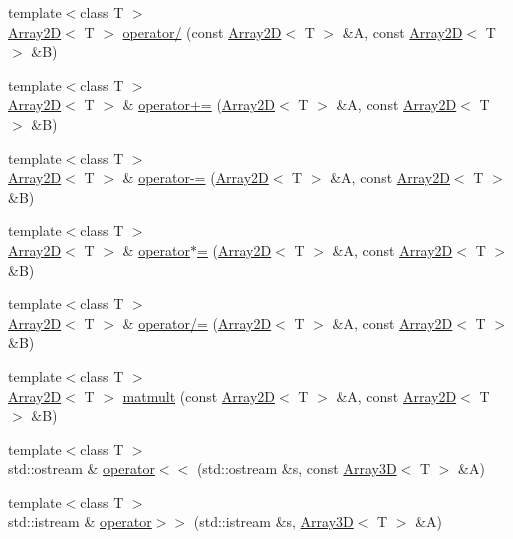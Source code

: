 \begin{DoxyCompactItemize}
\item 
{\footnotesize template$<$class T $>$ }\\\hyperlink{classTNT_1_1Array2D}{Array2D}$<$ T $>$ \hyperlink{namespaceTNT_af2275486defb3aa682168d59c8b5fefa}{operator/} (const \hyperlink{classTNT_1_1Array2D}{Array2D}$<$ T $>$ \&A, const \hyperlink{classTNT_1_1Array2D}{Array2D}$<$ T $>$ \&B)
\item 
{\footnotesize template$<$class T $>$ }\\\hyperlink{classTNT_1_1Array2D}{Array2D}$<$ T $>$ \& \hyperlink{namespaceTNT_a613b54428f9d71ec88bba64f0b1b2956}{operator+=} (\hyperlink{classTNT_1_1Array2D}{Array2D}$<$ T $>$ \&A, const \hyperlink{classTNT_1_1Array2D}{Array2D}$<$ T $>$ \&B)
\item 
{\footnotesize template$<$class T $>$ }\\\hyperlink{classTNT_1_1Array2D}{Array2D}$<$ T $>$ \& \hyperlink{namespaceTNT_a5f46b48fb7c2c25d9c78c888dfbfbb59}{operator-\/=} (\hyperlink{classTNT_1_1Array2D}{Array2D}$<$ T $>$ \&A, const \hyperlink{classTNT_1_1Array2D}{Array2D}$<$ T $>$ \&B)
\item 
{\footnotesize template$<$class T $>$ }\\\hyperlink{classTNT_1_1Array2D}{Array2D}$<$ T $>$ \& \hyperlink{namespaceTNT_a5d9f342f2de5edc0fce4481982924e44}{operator$\ast$=} (\hyperlink{classTNT_1_1Array2D}{Array2D}$<$ T $>$ \&A, const \hyperlink{classTNT_1_1Array2D}{Array2D}$<$ T $>$ \&B)
\item 
{\footnotesize template$<$class T $>$ }\\\hyperlink{classTNT_1_1Array2D}{Array2D}$<$ T $>$ \& \hyperlink{namespaceTNT_a3a7f9891f9ba3972d65fe38e18e94a1a}{operator/=} (\hyperlink{classTNT_1_1Array2D}{Array2D}$<$ T $>$ \&A, const \hyperlink{classTNT_1_1Array2D}{Array2D}$<$ T $>$ \&B)
\item 
{\footnotesize template$<$class T $>$ }\\\hyperlink{classTNT_1_1Array2D}{Array2D}$<$ T $>$ \hyperlink{namespaceTNT_a4c23204963622fcd58b1f5e0753a9a96}{matmult} (const \hyperlink{classTNT_1_1Array2D}{Array2D}$<$ T $>$ \&A, const \hyperlink{classTNT_1_1Array2D}{Array2D}$<$ T $>$ \&B)
\item 
{\footnotesize template$<$class T $>$ }\\std\+::ostream \& \hyperlink{namespaceTNT_aeeeff56627c80d662927afc43a148d90}{operator$<$$<$} (std\+::ostream \&s, const \hyperlink{classTNT_1_1Array3D}{Array3D}$<$ T $>$ \&A)
\item 
{\footnotesize template$<$class T $>$ }\\std\+::istream \& \hyperlink{namespaceTNT_a6657bdc30991a0a8b4dbd2563f52397c}{operator$>$$>$} (std\+::istream \&s, \hyperlink{classTNT_1_1Array3D}{Array3D}$<$ T $>$ \&A)

\end{DoxyCompactItemize}
